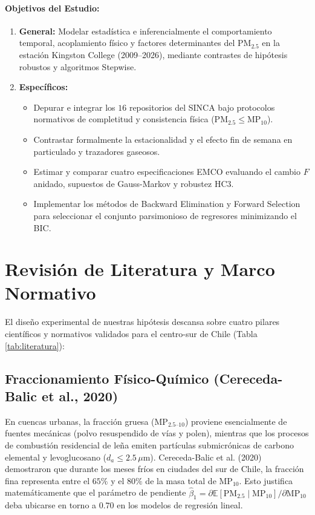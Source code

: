 \documentclass[10pt,twocolumn,a4paper]{article}
\begin{document}
\paragraph{Objetivos del Estudio:}
\begin{enumerate}
    \item \textbf{General:} Modelar estadística e inferencialmente el comportamiento temporal, acoplamiento físico y factores determinantes del $\text{PM}_{2.5}$ en la estación Kingston College (2009--2026), mediante contrastes de hipótesis robustos y algoritmos Stepwise.
    \item \textbf{Específicos:}
    \begin{itemize}
        \item Depurar e integrar los $16$ repositorios del SINCA bajo protocolos normativos de completitud y consistencia física ($\text{PM}_{2.5} \le \text{MP}_{10}$).
        \item Contrastar formalmente la estacionalidad y el efecto fin de semana en particulado y trazadores gaseosos.
        \item Estimar y comparar cuatro especificaciones EMCO evaluando el cambio $F$ anidado, supuestos de Gauss-Markov y robustez $\text{HC3}$.
        \item Implementar los métodos de Backward Elimination y Forward Selection para seleccionar el conjunto parsimonioso de regresores minimizando el BIC.
    \end{itemize}
\end{enumerate}

\section{Revisión de Literatura y Marco Normativo}

El diseño experimental de nuestras hipótesis descansa sobre cuatro pilares científicos y normativos validados para el centro-sur de Chile (Tabla \ref{tab:literatura}):

\subsection{Fraccionamiento Físico-Químico (Cereceda-Balic et al., 2020)}
En cuencas urbanas, la fracción gruesa ($\text{MP}_{2.5\text{--}10}$) proviene esencialmente de fuentes mecánicas (polvo resuspendido de vías y polen), mientras que los procesos de combustión residencial de leña emiten partículas submicrónicas de carbono elemental y levoglucosano ($d_a \le 2.5\,\mu\text{m}$). Cereceda-Balic et al. (2020) demostraron que durante los meses fríos en ciudades del sur de Chile, la fracción fina representa entre el $65\%$ y el $80\%$ de la masa total de $\text{MP}_{10}$. Esto justifica matemáticamente que el parámetro de pendiente $\hat{\beta}_1 = \partial \mathbb{E}[\text{PM}_{2.5} \mid \text{MP}_{10}] / \partial \text{MP}_{10}$ deba ubicarse en torno a $0.70$ en los modelos de regresión lineal.
\end{document}
